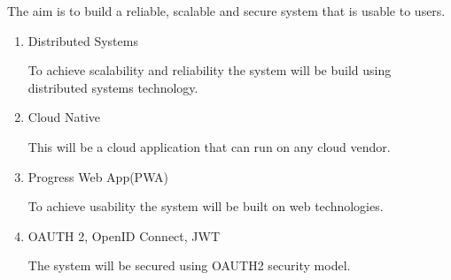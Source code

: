 The aim is to build a reliable, scalable and secure system that is usable to users.

\begin{enumerate}
      \item Distributed Systems

            To achieve scalability and reliability the system will be build using distributed systems technology.

      \item Cloud Native

            This will be a cloud application that can run on any cloud vendor.

      \item Progress Web App(PWA)

            To achieve usability the system will be built on web technologies.

      \item OAUTH 2, OpenID Connect, JWT

            The system will be secured using OAUTH2 security model.
\end{enumerate}